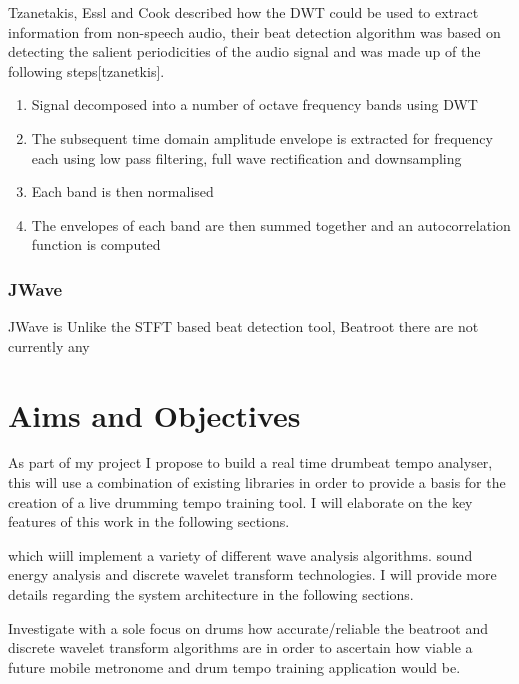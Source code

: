 \documentclass[a4paper, 11pt]{article}
\begin{document}
Tzanetakis, Essl and Cook described how the DWT could be used to extract information from non-speech audio, their beat detection algorithm was based on detecting the salient periodicities of the audio signal and was made up of the following steps[tzanetkis]. 

\begin{enumerate}
\item Signal decomposed into a number of octave frequency bands using DWT
\item The subsequent time domain amplitude envelope is extracted for frequency each using low pass filtering, full wave rectification and downsampling
\item Each band is then normalised
\item The envelopes of each band are then summed together and an autocorrelation function is computed
\end{enumerate}

\subsubsection{JWave}
JWave is 
Unlike the STFT based beat detection tool, Beatroot there are not currently any 

\maketitle{}
\section{Aims and Objectives}

As part of my project I propose to build a real time drumbeat tempo analyser, this will use a combination of existing libraries in order to provide a basis for the creation of a live drumming tempo training tool. I will elaborate on the key features of this work in the following sections.

 which wiill implement a variety of different wave analysis algorithms. sound energy analysis and discrete wavelet transform technologies. I will provide more details regarding the system architecture in the following sections. 

Investigate with a sole focus on drums how accurate/reliable the beatroot and discrete wavelet transform algorithms are in order to ascertain how viable a future mobile metronome and drum tempo training application would be.
\end{document}
